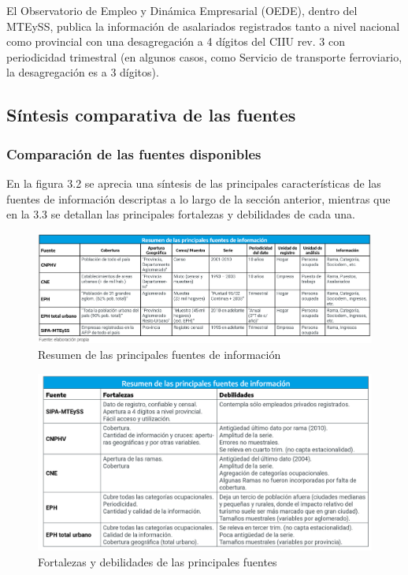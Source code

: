 \documentclass[
  openany]{book}
\begin{document}
El Observatorio de Empleo y Dinámica Empresarial (OEDE), dentro del MTEySS, publica la información de asalariados registrados tanto a nivel nacional como provincial con una desagregación a 4 dígitos del CIIU rev. 3 con periodicidad trimestral (en algunos casos, como Servicio de transporte ferroviario, la desagregación es a 3 dígitos).

\hypertarget{suxedntesis-comparativa-de-las-fuentes}{%
\subsection{Síntesis comparativa de las fuentes}\label{suxedntesis-comparativa-de-las-fuentes}}

\hypertarget{comparaciuxf3n-de-las-fuentes-disponibles}{%
\subsubsection{Comparación de las fuentes disponibles}\label{comparaciuxf3n-de-las-fuentes-disponibles}}

En la figura 3.2 se aprecia una síntesis de las principales características de las fuentes de información descriptas a lo largo de la sección anterior, mientras que en la 3.3 se detallan las principales fortalezas y debilidades de cada una.

\begin{figure}

{\centering \includegraphics[width=1\linewidth]{imagenes/figura3.1} 

}

\caption{Resumen de las principales fuentes de información}\label{fig:empleofuentes1}
\end{figure}

\begin{figure}

{\centering \includegraphics[width=1\linewidth]{imagenes/figura3.2} 

}

\caption{Fortalezas y debilidades de las principales fuentes}\label{fig:empleofuentes2}
\end{figure}
\end{document}

